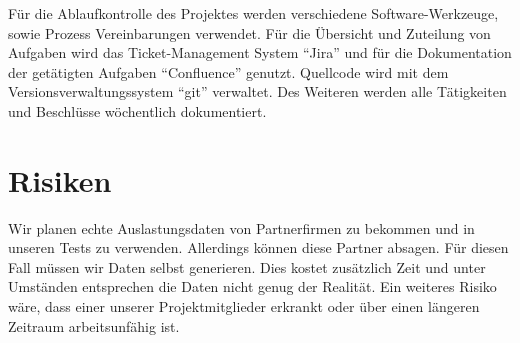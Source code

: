 Für die Ablaufkontrolle des Projektes werden verschiedene Software-Werkzeuge,
sowie Prozess Vereinbarungen verwendet. Für die Übersicht und Zuteilung von
Aufgaben wird das Ticket-Management System ``Jira'' und für die Dokumentation
der getätigten Aufgaben ``Confluence'' genutzt. Quellcode wird mit dem
Versionsverwaltungssystem ``git'' verwaltet. Des Weiteren werden alle
Tätigkeiten und Beschlüsse wöchentlich dokumentiert.

\section{Risiken}
Wir planen echte Auslastungsdaten von Partnerfirmen zu bekommen und in unseren
Tests zu verwenden. Allerdings können diese Partner absagen. Für diesen Fall
müssen wir Daten selbst generieren. Dies kostet zusätzlich Zeit und unter
Umständen entsprechen die Daten nicht genug der Realität. Ein weiteres Risiko
wäre, dass einer unserer Projektmitglieder erkrankt oder über einen längeren
Zeitraum arbeitsunfähig ist.

